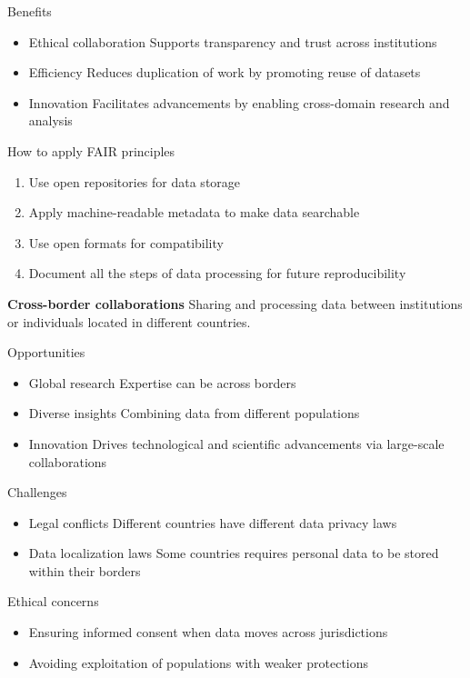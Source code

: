 Benefits
\begin{itemize}
    \item Ethical collaboration \ra Supports transparency and trust across institutions
    \item Efficiency \ra Reduces duplication of work by promoting reuse of datasets
    \item Innovation \ra Facilitates advancements by enabling cross-domain research and analysis
\end{itemize}
How to apply FAIR principles

\begin{enumerate}
    \item Use open repositories for data storage
    \item Apply machine-readable metadata to make data searchable
    \item Use open formats for compatibility
    \item Document all the steps of data processing for future reproducibility
\end{enumerate}

\vspace{10pt}
\textbf{Cross-border collaborations}
\vspace{10pt}
Sharing and processing data between institutions or individuals located
in different countries.

\vspace{10pt}

Opportunities

\begin{itemize}
    \item Global research \ra Expertise can be across borders
    \item Diverse insights \ra Combining data from different populations
    \item Innovation \ra Drives technological and scientific advancements via large-scale collaborations
\end{itemize}

Challenges
\begin{itemize}
    \item Legal conflicts \ra Different countries have different data privacy laws
    \item Data localization laws \ra Some countries requires personal data to be stored within their borders
\end{itemize}

Ethical concerns
\begin{itemize}
    \item Ensuring informed consent when data moves across jurisdictions
    \item Avoiding exploitation of populations with weaker protections
\end{itemize}

